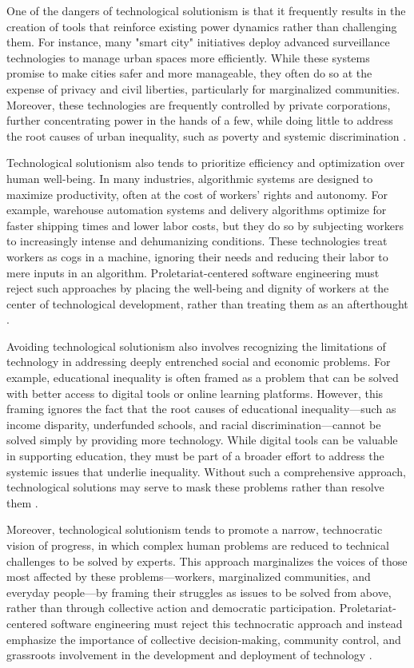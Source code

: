 \begin{refsection}
One of the dangers of technological solutionism is that it frequently results in the creation of tools that reinforce existing power dynamics rather than challenging them. For instance, many "smart city" initiatives deploy advanced surveillance technologies to manage urban spaces more efficiently. While these systems promise to make cities safer and more manageable, they often do so at the expense of privacy and civil liberties, particularly for marginalized communities. Moreover, these technologies are frequently controlled by private corporations, further concentrating power in the hands of a few, while doing little to address the root causes of urban inequality, such as poverty and systemic discrimination \cite[pp.~82-84]{morozov2015}.

Technological solutionism also tends to prioritize efficiency and optimization over human well-being. In many industries, algorithmic systems are designed to maximize productivity, often at the cost of workers’ rights and autonomy. For example, warehouse automation systems and delivery algorithms optimize for faster shipping times and lower labor costs, but they do so by subjecting workers to increasingly intense and dehumanizing conditions. These technologies treat workers as cogs in a machine, ignoring their needs and reducing their labor to mere inputs in an algorithm. Proletariat-centered software engineering must reject such approaches by placing the well-being and dignity of workers at the center of technological development, rather than treating them as an afterthought \cite[pp.~95-97]{eubanks2018}.

Avoiding technological solutionism also involves recognizing the limitations of technology in addressing deeply entrenched social and economic problems. For example, educational inequality is often framed as a problem that can be solved with better access to digital tools or online learning platforms. However, this framing ignores the fact that the root causes of educational inequality—such as income disparity, underfunded schools, and racial discrimination—cannot be solved simply by providing more technology. While digital tools can be valuable in supporting education, they must be part of a broader effort to address the systemic issues that underlie inequality. Without such a comprehensive approach, technological solutions may serve to mask these problems rather than resolve them \cite[pp.~112-115]{noble2019}.

Moreover, technological solutionism tends to promote a narrow, technocratic vision of progress, in which complex human problems are reduced to technical challenges to be solved by experts. This approach marginalizes the voices of those most affected by these problems—workers, marginalized communities, and everyday people—by framing their struggles as issues to be solved from above, rather than through collective action and democratic participation. Proletariat-centered software engineering must reject this technocratic approach and instead emphasize the importance of collective decision-making, community control, and grassroots involvement in the development and deployment of technology \cite[pp.~205-208]{benkler2010}.


\end{refsection}
